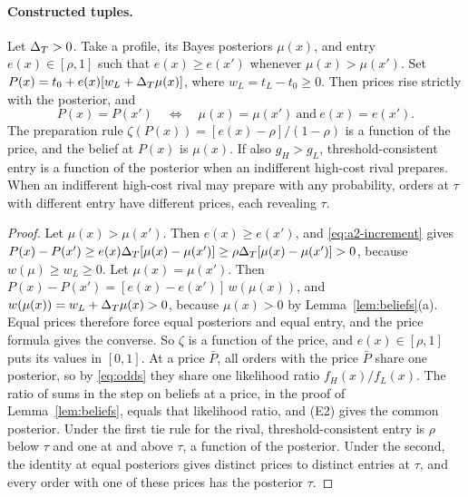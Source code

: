 \paragraph{Constructed tuples.}\label{par:constructed-tuples}
Let \(\Delta_T>0\). Take a profile, its Bayes posteriors \(\mu(x)\), and entry \(e(x)\in[\rho,1]\) such that
\(e(x)\ge e(x')\) whenever \(\mu(x)>\mu(x')\). Set \(P(x)=t_0+e(x)[w_L+\Delta_T\mu(x)]\), where \(w_L=t_L-t_0\ge0\).
Then prices rise strictly with the posterior, and
\[
P(x)=P(x')\quad\Longleftrightarrow\quad
\mu(x)=\mu(x')\ \text{and}\ e(x)=e(x').
\]
The preparation rule \(\zeta(P(x))=[e(x)-\rho]/(1-\rho)\) is a function of the price, and the belief at \(P(x)\)
is \(\mu(x)\). If also \(g_H>g_L\), threshold-consistent entry is a function of the posterior when an indifferent
high-cost rival prepares. When an indifferent high-cost rival may prepare with any probability,
orders at \(\tau\) with different entry have different prices, each revealing \(\tau\).

\begin{proof}
Let \(\mu(x)>\mu(x')\). Then \(e(x)\ge e(x')\), and \eqref{eq:a2-increment} gives
\(P(x)-P(x')\ge e(x)\Delta_T[\mu(x)-\mu(x')]\ge\rho\Delta_T[\mu(x)-\mu(x')]>0\), because \(w(\mu)\ge w_L\ge0\). Let
\(\mu(x)=\mu(x')\). Then \(P(x)-P(x')=[e(x)-e(x')]\,w(\mu(x))\), and \(w(\mu(x))=w_L+\Delta_T\mu(x)>0\), because
\(\mu(x)>0\) by Lemma~\ref{lem:beliefs}(a). Equal prices therefore force equal posteriors and equal entry, and the
price formula gives the converse. So \(\zeta\) is a function of the price, and \(e(x)\in[\rho,1]\) puts its values in
\([0,1]\). At a price \(\bar P\), all orders with the price \(\bar P\) share one posterior, so by \eqref{eq:odds}
they share one likelihood ratio \(f_H(x)/f_L(x)\). The ratio of sums in the step on beliefs at a price, in the
proof of Lemma~\ref{lem:beliefs}, equals that likelihood ratio, and (E2) gives the common posterior. Under the first tie rule for the rival, threshold-consistent entry is \(\rho\) below \(\tau\) and one at and above \(\tau\), a function
of the posterior. Under the second,
the identity at equal posteriors gives distinct prices to distinct entries at \(\tau\), and every order with one of
these prices has the posterior \(\tau\).
\end{proof}

